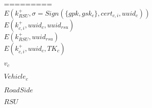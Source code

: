 \documentclass[]{article}
\begin{document}
=========
\\

$E(k^{+}_{RSU}, \sigma = Sign(\{gpk, gsk_{c}\}, cert_{c, i}, uuid_c))$
\\

$E(k^{+}_{c,i}, uuid_c, uuid_{rsu})$
\\

$E(k^{+}_{RSU}, uuid_{rsu})$
\\

$E(k^{+}_{c, i}, uuid_{c}, TK_{c})$

$v_c$

$Vehicle_c$

$RoadSide$

$RSU$



%
%
%
%
\end{document}
